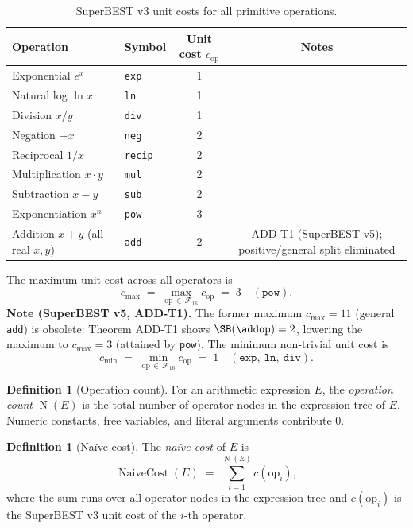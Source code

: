 \documentclass[12pt,a4paper]{article}
\theoremstyle{definition}
\newtheorem{definition}[theorem]{Definition}
\newcommand{\NC}{\operatorname{NaiveCost}}
\newcommand{\NOp}{\operatorname{N}}
\begin{document}
\begin{table}[h]
\centering
\caption{SuperBEST v3 unit costs for all primitive operations.}
\label{tab:superbest3}
\smallskip
\begin{tabular}{@{}llcc@{}}
\toprule
\textbf{Operation} & \textbf{Symbol} &
  \textbf{Unit cost $c_{\mathrm{op}}$} & \textbf{Notes} \\
\midrule
Exponential $e^x$             & \texttt{exp}   & 1  & \\
Natural log $\ln x$           & \texttt{ln}    & 1  & \\
Division $x/y$                & \texttt{div}   & 1  & \\
Negation $-x$                 & \texttt{neg}   & 2  & \\
Reciprocal $1/x$              & \texttt{recip} & 2  & \\
Multiplication $x \cdot y$    & \texttt{mul}   & 2  & \\
Subtraction $x - y$           & \texttt{sub}   & 2  & \\
Exponentiation $x^n$          & \texttt{pow}   & 3  & \\
Addition $x + y$ (all real $x,y$) & \texttt{add} & 2  & ADD-T1 (SuperBEST v5); positive/general split eliminated \\
\bottomrule
\end{tabular}
\end{table}

\noindent
The maximum unit cost across all operators is
\[
  c_{\max} \;=\; \max_{\mathrm{op}\,\in\,\mathcal{F}_{16}} c_{\mathrm{op}}
             \;=\; 3 \quad(\texttt{pow}).
\]
\noindent\textbf{Note (SuperBEST v5, ADD-T1).}
The former maximum $c_{\max} = 11$ (general \texttt{add}) is obsolete:
Theorem ADD-T1 shows $\SB(\addop) = 2$, lowering the maximum to $c_{\max} = 3$
(attained by \texttt{pow}).
The minimum non-trivial unit cost is
\[
  c_{\min} \;=\; \min_{\mathrm{op}\,\in\,\mathcal{F}_{16}} c_{\mathrm{op}}
             \;=\; 1 \quad(\texttt{exp},\ \texttt{ln},\ \texttt{div}).
\]

\begin{definition}[Operation count]
\label{def:opcount}
For an arithmetic expression $E$, the \emph{operation count} $\NOp(E)$ is the
total number of operator nodes in the expression tree of $E$.  Numeric
constants, free variables, and literal arguments contribute 0.
\end{definition}

\begin{definition}[Na\"{i}ve cost]
\label{def:NC}
The \emph{na\"{i}ve cost} of $E$ is
\[
  \NC(E) \;=\; \sum_{i=1}^{\NOp(E)} c(\mathrm{op}_i),
\]
where the sum runs over all operator nodes in the expression tree and
$c(\mathrm{op}_i)$ is the SuperBEST v3 unit cost of the $i$-th operator.
\end{definition}
\end{document}
